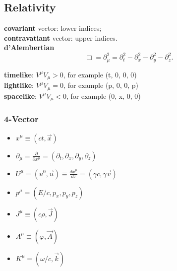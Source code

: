 \subsection{Relativity}

\textbf{covariant} vector: lower indices;    \\
\textbf{contravatiant} vector: upper indices.	\\
\textbf{d'Alembertian} 
\begin{equation}
    \label{eqn:d'Alembertian}
    \Box = \partial^2_\mu = \partial_t^2-\partial_x^2-\partial_y^2-\partial_z^2.
\end{equation}

\textbf{timelike}:  $V^\mu V_\mu > 0$, for example (t, 0, 0, 0)	\\
\textbf{lightlike}:  $V^\mu V_\mu = 0$, for example (p, 0, 0, p)	\\
\textbf{spacelike}:  $V^\mu V_\mu < 0$, for example (0, x, 0, 0)
\subsubsection{4-Vector}
\begin{itemize}
    \item $x^\mu \equiv (ct, \vec{x})$
    \item $\partial_\mu = \frac{\partial}{\partial x^\mu} = (\partial_t, \partial_x, \partial_y, \partial_z)$
    \item $U^\mu = (u^0, \vec{u}) \equiv \frac{dx^\mu}{d\tau} = (\gamma c, \gamma\vec{v})$
    \item $p^\mu = (E/c, p_x, p_y, p_z)$
    \item $J^\mu \equiv (c\rho, \vec{J})$
    \item $A^{\mu} \equiv (\varphi, \vec{A})$
    \item $K^\mu = (\omega/c, \vec{k})$
\end{itemize}



